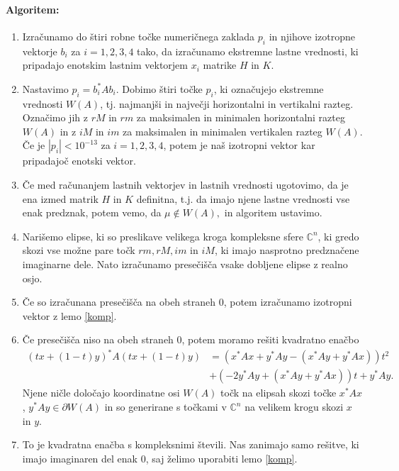 \documentclass[12pt,a4paper]{amsart}
\theoremstyle{definition}
\theoremstyle{plain}
\newcommand{\C}{\mathbb C}
\begin{document}
\paragraph{Algoritem:}
\begin{enumerate}[1.]
\item Izračunamo do štiri robne točke numeričnega zaklada $p_i$ in njihove izotropne vektorje $b_i$ za $i=1,2,3,4$ tako, da izračunamo ekstremne lastne vrednosti, ki pripadajo enotskim lastnim vektorjem $x_i$ %
matrike $H$ in $K$.
\item Nastavimo $p_i =b^\ast _i Ab_i$. Dobimo štiri točke $p_i$, ki označujejo ekstremne vrednosti $W(A)$, tj. najmanjši in največji horizontalni in vertikalni razteg. Označimo jih z $rM$ in $rm$ za maksimalen in minimalen horizontalni razteg $W(A)$ in z $iM$ in $im$ za maksimalen in minimalen vertikalen razteg $W(A)$. Če je $|p_i|<10^{-13}$ za $i=1,2,3,4$, potem je naš izotropni vektor kar pripadajoč enotski vektor.
\item Če med računanjem lastnih vektorjev in lastnih vrednosti ugotovimo, da je ena izmed matrik $H$ in $K$ definitna, t.j. da imajo njene lastne vrednosti vse enak predznak, potem vemo, da $\mu \not\in W(A),$ in algoritem ustavimo.
\item Narišemo elipse, ki so preslikave velikega kroga kompleksne sfere $\C^n$, ki gredo skozi vse možne pare točk $rm, rM, im$ in $iM$, ki imajo nasprotno predznačene imaginarne dele. Nato izračunamo presečišča vsake dobljene elipse z realno osjo.%
\item Če so izračunana presečišča na obeh straneh 0, potem izračunamo izotropni vektor z lemo \ref{komp}.
\item Če presečišča niso na obeh straneh 0, potem moramo rešiti kvadratno enačbo 
\begin{align}\label{eq:en3}
(tx +(1-t)y)^\ast A(tx+(1-t)y) & =(x^\ast Ax+y^\ast Ay -(x^\ast Ay +y^\ast Ax))t^2 \\
&+(-2y^\ast Ay +(x^\ast Ay+y^\ast Ax))t +y^\ast Ay.\nonumber
\end{align}
Njene ničle določajo koordinatne osi $W(A)$ točk na elipsah skozi točke $x^\ast Ax$, $y^\ast Ay\in \partial W(A)$ %
in so generirane s točkami v $\C^n$ na velikem krogu skozi $x$ in $y$. 
\item To je kvadratna enačba s kompleksnimi števili. Nas zanimajo samo rešitve, ki imajo imaginaren del enak 0, saj želimo uporabiti lemo \ref{komp}.

\end{enumerate}
\end{document}
